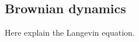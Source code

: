 \documentclass[../../main-notes.tex]{subfiles}
\begin{document}
\subsection{Brownian dynamics}

Here explain the Langevin equation.
\end{document}
